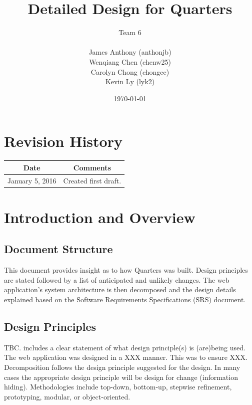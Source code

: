 \documentclass[12pt]{article}
\begin{document}
\title{Detailed Design for Quarters}
\author{Team 6\\ \\James Anthony (anthonjb)\\ Wenqiang Chen (chenw25)\\ Carolyn Chong
(chongce)\\ Kevin Ly (lyk2)}
\date{\today}

\maketitle

\pagebreak

\tableofcontents
\listoffigures

\section*{Revision History}
\begin{tabular}{|c|c|}
\hline
\textbf{Date}  & \textbf{Comments} \\ \hline
January 5, 2016 & Created first draft. \\
\hline
\end{tabular}

\pagebreak


\section{Introduction and Overview}

\subsection{Document Structure}
This document provides insight as to how Quarters was built. Design principles are stated followed by a list of anticipated and unlikely changes. The web application's system architecture is then decomposed and the design details explained based on the Software Requirements Specifications (SRS) document.

\subsection{Design Principles}
TBC. includes a clear statement of what design principle(s) is (are)being used. The web application was designed in a XXX manner. This was to ensure XXX. Decomposition follows the design principle suggested for the design. In many cases the appropriate design principle will be design for change (information hiding). Methodologies include top-down, bottom-up, stepwise refinement, prototyping, modular, or object-oriented.
\end{document}
